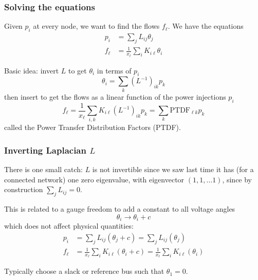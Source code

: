 \documentclass[10pt,dvipsnames]{beamer}
\begin{document}
\begin{frame}
  \frametitle{Solving the equations}

  Given $p_i$ at every node, we want to find the flows $f_\ell$. We
  have the equations
    \begin{align*}
      p_i & = \sum_{j} L_{ij} \theta_j \\
     f_\ell  & = \frac{1}{x_\ell}\sum_{i} K_{i\ell} \theta_i
    \end{align*}

    Basic idea: invert $L$ to get $\theta_i$ in terms of $p_i$
    \begin{equation*}
      \theta_i  = \sum_{k} (L^{-1})_{ik} p_k
    \end{equation*}
    then insert to get the flows as a linear function of the power injections $p_i$
    \begin{equation*}
    f_\ell   = \frac{1}{x_\ell}\sum_{i,k} K_{i\ell}  (L^{-1})_{ik} p_k = \sum_k \textrm{PTDF}_{\ell k} p_k
    \end{equation*}
    called the \alert{Power Transfer Distribution Factors} (PTDF).

\end{frame}


\begin{frame}
  \frametitle{Inverting Laplacian $L$}

  There is one small catch: $L$ is \alert{not invertible} since we saw last
  time it has (for a connected network) one zero eigenvalue, with
  eigenvector $(1,1, \dots 1)$, since by construction $\sum_j L_{ij} =
  0$.

  This is related to a gauge freedom to add a constant to all voltage angles
  \begin{equation*}
    \theta_i \to \theta_i + c
  \end{equation*}
  which does not affect physical quantities:
    \begin{align*}
      p_i & = \sum_{j} L_{ij} (\theta_j+ c) = \sum_{j} L_{ij} (\theta_j)  \\
     f_\ell  & = \frac{1}{x_\ell}\sum_{i} K_{i\ell}( \theta_i  + c) = \frac{1}{x_\ell}\sum_{i} K_{i\ell}( \theta_i )
    \end{align*}

    Typically choose a \alert{slack} or \alert{reference bus} such that  $\theta_1 = 0$.


\end{frame}
\end{document}
